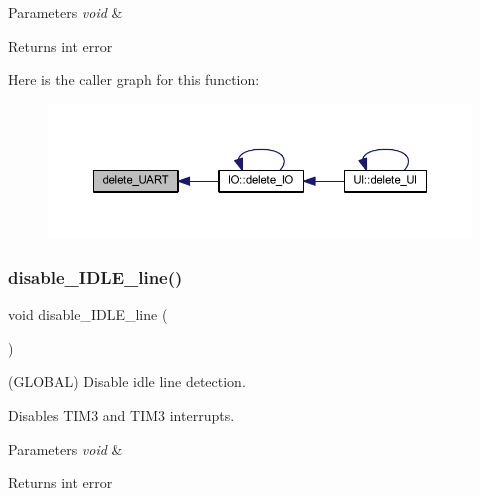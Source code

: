 \begin{DoxyParams}{Parameters}
{\em void} & \\
\hline
\end{DoxyParams}
\begin{DoxyReturn}{Returns}
int error 
\end{DoxyReturn}
Here is the caller graph for this function\+:\nopagebreak
\begin{figure}[H]
\begin{center}
\leavevmode
\includegraphics[width=350pt]{namespace_u_a_r_t_ab7d8037afb7dff98f21b6a07b3fc2158_icgraph}
\end{center}
\end{figure}
\mbox{\label{namespace_u_a_r_t_ade4e159fcbcb9a63bcf9557b23f064df}} 
\subsubsection{\texorpdfstring{disable\+\_\+\+I\+D\+L\+E\+\_\+line()}{disable\_IDLE\_line()}}
{\footnotesize\ttfamily void disable\+\_\+\+I\+D\+L\+E\+\_\+line (\begin{DoxyParamCaption}\item[{void}]{ }\end{DoxyParamCaption})}



(G\+L\+O\+B\+AL) Disable idle line detection. 

Disables T\+I\+M3 and T\+I\+M3 interrupts.


\begin{DoxyParams}{Parameters}
{\em void} & \\
\hline
\end{DoxyParams}
\begin{DoxyReturn}{Returns}
int error 
\end{DoxyReturn}
\mbox{\label{namespace_u_a_r_t_a92da5727d9a24141d77c8acb1fc776d0}} 

